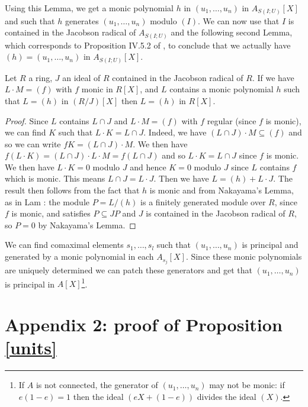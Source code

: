  Using this Lemma, we get a monic polynomial $h$ in $(u_1,\dots,u_n)$ in $A_{S(I;U)}[X]$
 and such that $h$ generates $(u_1,\dots,u_n)$ modulo $(I)$.
 We can now use that $I$ is contained in the Jacobson radical of $A_{S(I;U)}$ and the
 following second Lemma, which corresponds to Proposition IV.5.2 of \cite{Lam},
 to conclude that we actually have $(h) = (u_1,\dots,u_n)$ in $A_{S(I;U)}[X]$.

\begin{lemma}
  Let $R$ a ring, $J$ an ideal of $R$ contained in the Jacobson radical of $R$. If
  we have $L\cdot M = (f)$ with $f$ monic in $R[X]$, and $L$ contains a monic polynomial
  $h$ such that $L = (h)$ in $(R/J)[X]$ then $L = (h)$ in $R[X]$.
\end{lemma}

\begin{proof}
  Since $L$ contains $L\cap J$ and $L\cdot M = (f)$ with $f$ regular (since $f$ is monic),
  we can find $K$   such that $L\cdot K = L\cap J$. Indeed, we have $(L\cap J)\cdot M \subseteq (f)$
  and so we can write $f K = (L\cap J)\cdot M$. We then have $f (L\cdot K) = (L\cap J)\cdot L\cdot M = f (L\cap J)$
  and so $L\cdot K = L\cap J$ since $f$ is monic.
  We then have $L\cdot K = 0$ modulo $J$ and hence $K = 0$ modulo $J$ since $L$ contains $f$
  which is monic.
  This means $L\cap J = L\cdot J$. Then we have $L = (h) + L\cdot J$.
  The result then follows from the fact that $h$ is monic and from Nakayama's Lemma, as in Lam \cite{Lam}:
  the module $P = L/(h)$ is a finitely generated module over $R$, since $f$ is monic, and satisfies
  $P\subseteq JP$ and $J$ is contained in the Jacobson radical of $R$, so $P = 0$ by Nakayama's Lemma.
\end{proof}

\begin{corollary}
  We can find comaximal elements $s_1,\dots,s_l$ such that $(u_1,\dots,u_n)$ is principal and generated by a
  monic polynomial in each $A_{s_j}[X]$. Since these monic polynomials are uniquely determined
  we can patch these generators and get that $(u_1,\dots,u_n)$ is principal in $A[X]$\footnote{If $A$ is not
  connected, the generator of $(u_1,\dots,u_n)$ may not be monic: if $e(1-e)=1$ then the ideal $(eX+(1-e))$
  divides the ideal $(X)$.}.
\end{corollary}

\newpage

\section*{Appendix 2: proof of Proposition \ref{units}}

